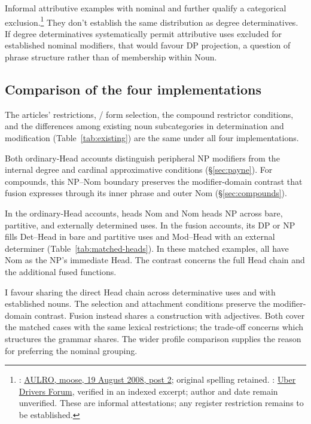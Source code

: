 \documentclass[12pt]{article}
\begin{document}
Informal attributive examples with nominal  and  further qualify a categorical exclusion.\footnote{: \href{https://www.aulro.com/afvb/motor-cycling/61858-my-track-day-phillip-island-motogp-track-post798794.html}{AULRO, moose, 19 August 2008, post 2}; original spelling retained. : \href{https://www.uberpeople.net/threads/let-s-play-would-you-have-taken-this-trip.395130/}{Uber Drivers Forum}, verified in an indexed excerpt; author and date remain unverified. These are informal attestations; any register restriction remains to be established.} They don't establish the same distribution as degree determinatives. If degree determinatives systematically permit attributive uses excluded for established nominal modifiers, that would favour DP projection, a question of phrase structure rather than of membership within Noun.

\subsection{Comparison of the four implementations}\label{sec:costs}

The articles' restrictions, / form selection, the compound restrictor conditions, and the differences among existing noun subcategories in determination and modification (Table~\ref{tab:existing}) are the same under all four implementations.

Both ordinary-Head accounts distinguish peripheral NP modifiers from the internal degree and cardinal approximative conditions (§\ref{sec:payne}). For compounds, this NP--Nom boundary preserves the modifier-domain contrast that fusion expresses through its inner phrase and outer Nom (§\ref{sec:compounds}).

In the ordinary-Head accounts,  heads Nom and Nom heads NP across bare, partitive, and externally determined uses. In the fusion accounts, its DP or NP fills Det--Head in bare and partitive uses and Mod--Head with an external determiner (Table~\ref{tab:matched-heads}). In these matched examples, all have Nom as the NP's immediate Head. The contrast concerns the full Head chain and the additional fused functions.

I favour sharing the direct Head chain across determinative uses and with established nouns. The selection and attachment conditions preserve the modifier-domain contrast. Fusion instead shares a construction with adjectives. Both cover the matched cases with the same lexical restrictions; the trade-off concerns which structures the grammar shares. The wider profile comparison supplies the reason for preferring the nominal grouping.
\end{document}
